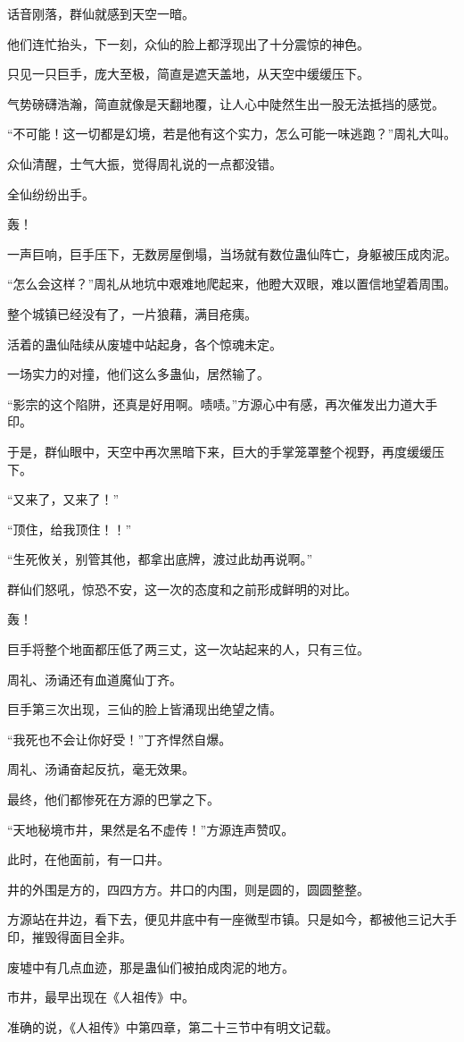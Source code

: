 \begin{this_body}
话音刚落，群仙就感到天空一暗。

他们连忙抬头，下一刻，众仙的脸上都浮现出了十分震惊的神色。

只见一只巨手，庞大至极，简直是遮天盖地，从天空中缓缓压下。

气势磅礴浩瀚，简直就像是天翻地覆，让人心中陡然生出一股无法抵挡的感觉。

“不可能！这一切都是幻境，若是他有这个实力，怎么可能一味逃跑？”周礼大叫。

众仙清醒，士气大振，觉得周礼说的一点都没错。

全仙纷纷出手。

轰！

一声巨响，巨手压下，无数房屋倒塌，当场就有数位蛊仙阵亡，身躯被压成肉泥。

“怎么会这样？”周礼从地坑中艰难地爬起来，他瞪大双眼，难以置信地望着周围。

整个城镇已经没有了，一片狼藉，满目疮痍。

活着的蛊仙陆续从废墟中站起身，各个惊魂未定。

一场实力的对撞，他们这么多蛊仙，居然输了。

“影宗的这个陷阱，还真是好用啊。啧啧。”方源心中有感，再次催发出力道大手印。

于是，群仙眼中，天空中再次黑暗下来，巨大的手掌笼罩整个视野，再度缓缓压下。

“又来了，又来了！”

“顶住，给我顶住！！”

“生死攸关，别管其他，都拿出底牌，渡过此劫再说啊。”

群仙们怒吼，惊恐不安，这一次的态度和之前形成鲜明的对比。

轰！

巨手将整个地面都压低了两三丈，这一次站起来的人，只有三位。

周礼、汤诵还有血道魔仙丁齐。

巨手第三次出现，三仙的脸上皆涌现出绝望之情。

“我死也不会让你好受！”丁齐悍然自爆。

周礼、汤诵奋起反抗，毫无效果。

最终，他们都惨死在方源的巴掌之下。

“天地秘境市井，果然是名不虚传！”方源连声赞叹。

此时，在他面前，有一口井。

井的外围是方的，四四方方。井口的内围，则是圆的，圆圆整整。

方源站在井边，看下去，便见井底中有一座微型市镇。只是如今，都被他三记大手印，摧毁得面目全非。

废墟中有几点血迹，那是蛊仙们被拍成肉泥的地方。

市井，最早出现在《人祖传》中。

准确的说，《人祖传》中第四章，第二十三节中有明文记载。

\end{this_body}

